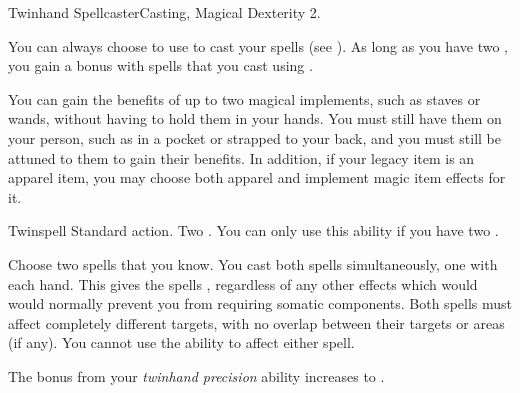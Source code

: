  \begin{magicalfeat}{Twinhand Spellcaster}{Casting, Magical}
    \featpre Dexterity 2.

     You can always choose to use  to cast your spells (see ).
    As long as you have two , you gain a   bonus with spells that you cast using .

     You can gain the benefits of up to two magical implements, such as staves or wands, without having to hold them in your hands.
    You must still have them on your person, such as in a pocket or strapped to your back, and you must still be attuned to them to gain their benefits.
    In addition, if your legacy item is an apparel item, you may choose both apparel and implement magic item effects for it.

    \begin{magicalactiveability}{Twinspell}
      \abilityusagetime Standard action.
      \abilitycost Two .
      \rankline
      You can only use this ability if you have two .

      Choose two spells that you know.
      You cast both spells simultaneously, one with each hand.
      This gives the spells , regardless of any other effects which would would normally prevent you from requiring somatic components.
      Both spells must affect completely different targets, with no overlap between their targets or areas (if any).
      You cannot use the  ability to affect either spell.
    \end{magicalactiveability}

     The bonus from your \textit{twinhand precision} ability increases to .
  \end{magicalfeat}

